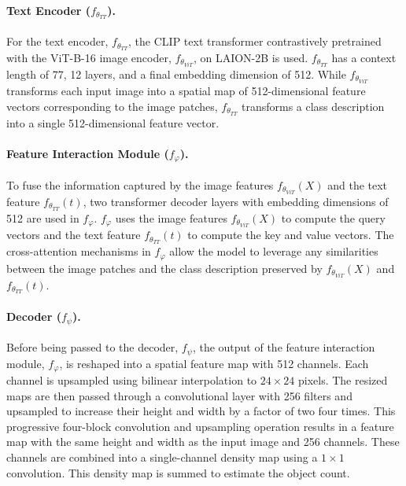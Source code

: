 \documentclass{bmvc2k}
\begin{document}
\paragraph{Text Encoder ($f_{\theta_{TT}}$).}
For the text encoder, $f_{\theta_{TT}}$, the CLIP text transformer \cite{Radford2021LearningTV, ilharco_gabriel_2021_5143773} contrastively pretrained with the ViT-B-16 image encoder, $f_{\theta_{ViT}}$, on LAION-2B \cite{schuhmann2022laionb} is used. $f_{\theta_{TT}}$ has a context length of 77, 12 layers, and a final embedding dimension of 512. While $f_{\theta_{ViT}}$ transforms each input image into a spatial map of 512-dimensional feature vectors corresponding to the image patches, $f_{\theta_{TT}}$ transforms a class description into a single 512-dimensional feature vector. 
\paragraph{Feature Interaction Module ($f_{\varphi}$).}
To fuse the information captured by the image features $f_{\theta_{ViT}}(X)$ and the text feature $f_{\theta_{TT}}(t)$, two transformer decoder layers with embedding dimensions of 512 are used in $f_{\varphi}$. $f_{\varphi}$ uses the image features $f_{\theta_{ViT}}(X)$ to compute the query vectors and the text feature $f_{\theta_{TT}}(t)$ to compute the key and value vectors. The cross-attention mechanisms in $f_{\varphi}$ allow the model to leverage any similarities between the image patches and the class description preserved by $f_{\theta_{ViT}}(X)$ and $f_{\theta_{TT}}(t)$. 
\paragraph{Decoder ($f_{\psi}$).}
Before being passed to the decoder, $f_{\psi}$, the output of the feature interaction module, $f_{\varphi}$, is reshaped into a spatial feature map with 512 channels. Each channel is upsampled using bilinear interpolation to $24 \times 24$ pixels. The resized maps are then passed through a convolutional layer with 256 filters and upsampled to increase their height and width by a factor of two four times. This progressive four-block convolution and upsampling operation results in a feature map with the same height and width as the input image and 256 channels. These channels are combined into a single-channel density map using a $1\times1$ convolution. This density map is summed to estimate the object count. 
\end{document}
